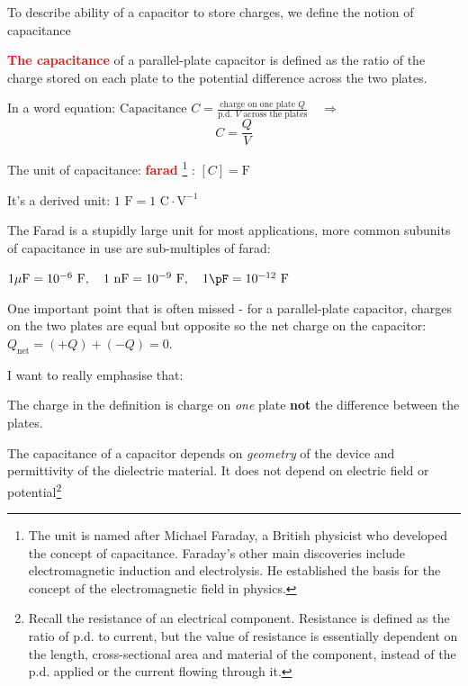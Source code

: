 \documentclass[a4paper,12pt]{book}
\newenvironment{ilight}
  {\centering
  	\vspace*{6pt}
  	\begin{tcolorbox}[colframe=Gray,colback=LightGrey!15]
  \setlength{\baselineskip}{\baselineskip}%
  }
  {\end{tcolorbox}\vspace*{-4pt}}
\newcommand{\keypoint}[1]{\textbf{\textcolor{red}{#1}}}
\newcommand{\muF}{\mu\text{F}}
\newcommand{\tcbhighmath}[1]{\boxed{#1}}
\newcommand{\keypoint}[1]{\textbf{\textcolor{red}{#1}}}
\begin{document}
To describe ability of a capacitor to store charges, we define the notion of capacitance

\begin{ilight}
	\keypoint{The capacitance} of a parallel-plate capacitor is defined as the ratio of the charge stored on each plate to the potential difference across the two plates.
\end{ilight}

In a word equation: $\text{Capacitance } C = \frac{\text{charge on one plate }Q }{\text{p.d. } V \text{ across the plates}} \quad \Rightarrow \quad$ $$\tcbhighmath{C = \frac{Q}{V}}$$

The unit of capacitance: \keypoint{farad}
\footnote{The unit is named after Michael Faraday, a British physicist who developed the concept of capacitance. Faraday's other main discoveries include electromagnetic induction and electrolysis. He established the basis for the concept of the electromagnetic field in physics.}
: $[C] = \text{F}$

It's a derived unit: $1 \text{ F} = 1 \text{ C}\cdot\text{V}^{-1}$

The Farad is a stupidly large unit for most applications, more common subunits of capacitance in use are sub-multiples of farad:

{
	
\centering

$1 \muF = 10^{-6} \text{ F}, \quad 1 \text{ nF} = 10^{-9} \text{ F}, \quad 1 \pF = 10^{-12} \text{ F}$

}

One important point that is often missed - for a parallel-plate capacitor, charges on the two plates are equal but opposite so the net charge on the capacitor: $Q_\text{net} = (+Q)+(-Q)=0$. 

I want to really emphasise that:
\begin{ilight}
    The charge in the definition is charge on \emph{one} plate \textbf{not} the difference between the plates.
\end{ilight}

The capacitance of a capacitor depends on \emph{geometry} of the device and permittivity of the dielectric material. It does not depend on electric field or potential\footnote{Recall the resistance of an electrical component. Resistance is defined as the ratio of p.d. to current, but the value of resistance is essentially dependent on the length, cross-sectional area and material of the component, instead of the p.d. applied or the current flowing through it.}
\end{document}
